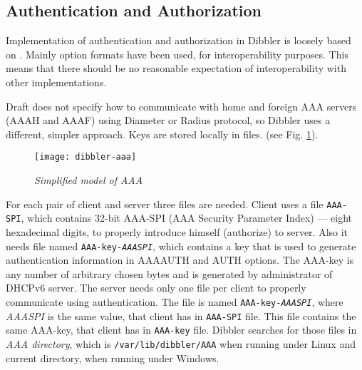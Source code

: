 \subsection{Authentication and Authorization}
\label{feature-auth}

Implementation of authentication and authorization in Dibbler is
loosely based on \cite{draft-aaa}. Mainly option formats have been
used, for interoperability purposes. This means that there should be
no reasonable expectation of interoperability with other
implementations.

Draft does not specify how to communicate with home and foreign AAA
servers (AAAH and AAAF) using Diameter or Radius protocol, so Dibbler
uses a different, simpler approach. Keys are stored locally in
files. (see Fig. \ref{fig-aaa}).

\begin{figure}[ht]
\begin{center}
\label{fig-aaa}
\texttt{[image: dibbler-aaa]}
\caption{\emph{Simplified model of AAA}}
\end{center}
\end{figure}

For each pair of client and server three files are needed. Client uses
a file \texttt{AAA-SPI}, which contains 32-bit AAA-SPI (AAA Security
Parameter Index) --- eight hexadecimal digits, to properly introduce
himself (authorize) to server. Also it needs file named
\texttt{AAA-key-\textit{AAASPI}}, which contains a key that is used to
generate authentication information in AAAAUTH and AUTH options. The
AAA-key is any number of arbitrary chosen bytes and is generated by
administrator of DHCPv6 server. The server needs only one file per
client to properly communicate using authentication. The file is named
\texttt{AAA-key-\textit{AAASPI}}, where \textit{AAASPI} is the same
value, that client has in \texttt{AAA-SPI} file. This file contains
the same AAA-key, that client has in \texttt{AAA-key} file. Dibbler
searches for those files in \textit{AAA directory}, which is
\texttt{/var/lib/dibbler/AAA} when running under Linux and current
directory, when running under Windows.

